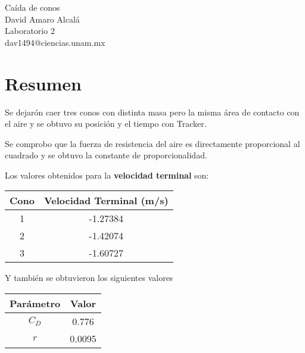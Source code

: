 \begin{center}
    {\huge Caída de conos}\\
    {\normalsize David Amaro Alcalá}\\
    {\normalsize Laboratorio 2}\\
    dav1494@ciencias.unam.mx\\
\end{center}

\section*{Resumen}

Se dejarón caer tres conos con distinta masa pero la misma área
de contacto con el aire y se obtuvo su posición y el tiempo
con Tracker.

Se comprobo que la fuerza de resistencia del aire es directamente
proporcional al cuadrado y se obtuvo la constante de proporcionalidad.

Los valores obtenidos para la \textbf{velocidad terminal} son:

\begin{Tabla}
    \centering
    \begin{tabular}{|c|c|}
        \hline
        \rowcolor{azulito} Cono & Velocidad Terminal (m/s)  \\
        \hline 1 & -1.27384 \\
        \hline 2 & -1.42074 \\
        \hline 3 & -1.60727 \\
        \hline
    \end{tabular}
\end{Tabla}

Y también se obtuvieron los siguientes valores

\begin{Tabla}
    \centering
    \begin{tabular}{|c|c|}
        \hline 
        \rowcolor{azulito} Parámetro & Valor \\
        \hline $C_D$ & 0.776 \\
        \hline $r$ & 0.0095 \\
        \hline
    \end{tabular}
\end{Tabla}
